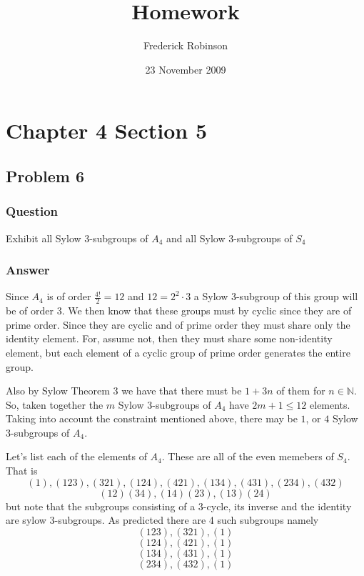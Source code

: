 \documentclass[12pt]{article}
\title{Homework}
\author{Frederick Robinson}
\date{23 November 2009}
\begin{document}

\maketitle


\tableofcontents

\section{Chapter 4 Section 5}

\subsection{Problem 6}

\subsubsection{Question}

Exhibit all Sylow 3-subgroups of $A_4$ and all Sylow 3-subgroups of $S_4$

\subsubsection{Answer}

Since $A_4$ is of order $\frac{4!}{2}=12$ and $12=2^2 \cdot 3$ a Sylow 3-subgroup of this group will be of order 3. We then know that these groups must by cyclic since they are of prime order.  Since they are cyclic and of prime order they must share only the identity element. For, assume not, then they must share some non-identity element, but each element of a cyclic group of prime order generates the entire group. 

Also by Sylow Theorem 3 we have that there must be $1 + 3 n$ of them for $n\in\mathbb{N}$. So, taken together the $m$ Sylow 3-subgroups of $A_4$ have $2m+1 \leq 12$ elements. Taking into account the constraint mentioned above, there may be $1$, or $4$ Sylow 3-subgroups of $A_4$.

Let's list each of the elements of $A_4$. These are all of the even memebers of $S_4$. That is
\[(1), (1 2 3), (3 2 1), (1 2 4), (4 2 1), (1 3 4), (4 3 1), (2 3 4), (4 3 2)\]
\[(1 2)(3 4), (1 4)(2 3),(1 3)(2 4)\]
but note that the subgroups consisting of a 3-cycle, its inverse and the identity are sylow 3-subgroups. As predicted there are 4 such subgroups namely
\[(1 2 3), (3 2 1), (1)\]
\[(1 2 4), (4 2 1), (1)\]
\[(1 3 4), (4 3 1), (1)\]
\[(2 3 4), (4 3 2), (1)\]
\end{document}
